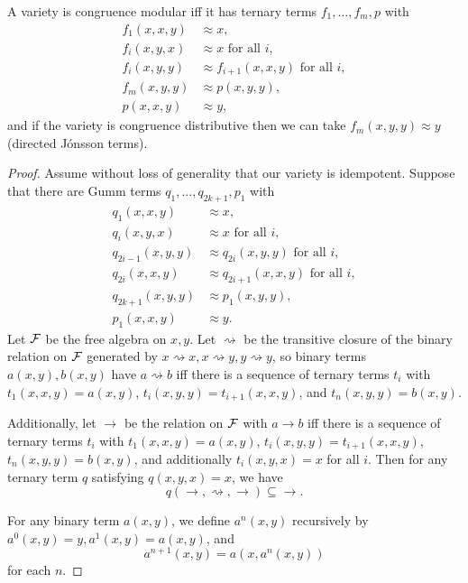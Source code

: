 \documentclass[letterpaper,11pt]{article}
\begin{document}
\begin{thm}\label{directed-gumm-terms} A variety is congruence modular iff it has ternary terms $f_1, ..., f_m, p$ with
\begin{align*}
f_1(x,x,y) &\approx x,\\
f_i(x,y,x) &\approx x\text{ for all }i,\\
f_i(x,y,y) &\approx f_{i+1}(x,x,y)\text{ for all }i,\\
f_m(x,y,y) &\approx p(x,y,y),\\
p(x,x,y) &\approx y,
\end{align*}
and if the variety is congruence distributive then we can take $f_m(x,y,y) \approx y$ (directed J\'onsson terms).
\end{thm}
\begin{proof} Assume without loss of generality that our variety is idempotent. Suppose that there are Gumm terms $q_1, ..., q_{2k+1}, p_1$ with
\begin{align*}
q_1(x,x,y) &\approx x,\\
q_i(x,y,x) &\approx x\text{ for all }i,\\
q_{2i-1}(x,y,y) &\approx q_{2i}(x,y,y)\text{ for all }i,\\
q_{2i}(x,x,y) &\approx q_{2i+1}(x,x,y)\text{ for all }i,\\
q_{2k+1}(x,y,y) &\approx p_1(x,y,y),\\
p_1(x,x,y) &\approx y.
\end{align*}
Let $\mathcal{F}$ be the free algebra on $x,y$. Let $\rightsquigarrow$ be the transitive closure of the binary relation on $\mathcal{F}$ generated by $x\rightsquigarrow x, x\rightsquigarrow y, y\rightsquigarrow y$, so binary terms $a(x,y),b(x,y)$ have $a \rightsquigarrow b$ iff there is a sequence of ternary terms $t_i$ with $t_1(x,x,y) = a(x,y)$, $t_i(x,y,y) = t_{i+1}(x,x,y)$, and $t_n(x,y,y) = b(x,y)$.

Additionally, let $\rightarrow$ be the relation on $\mathcal{F}$ with $a \rightarrow b$ iff there is a sequence of ternary terms $t_i$ with $t_1(x,x,y) = a(x,y)$, $t_i(x,y,y) = t_{i+1}(x,x,y)$, $t_n(x,y,y) = b(x,y)$, and additionally $t_i(x,y,x) = x$ for all $i$. Then for any ternary term $q$ satisfying $q(x,y,x) = x$, we have
\[
q(\rightarrow,\rightsquigarrow,\rightarrow) \subseteq \rightarrow.
\]

For any binary term $a(x,y)$, we define $a^n(x,y)$ recursively by $a^0(x,y) = y, a^1(x,y) = a(x,y)$, and
\[
a^{n+1}(x,y) = a(x,a^n(x,y))
\]
for each $n$.


\end{proof}
\end{document}
